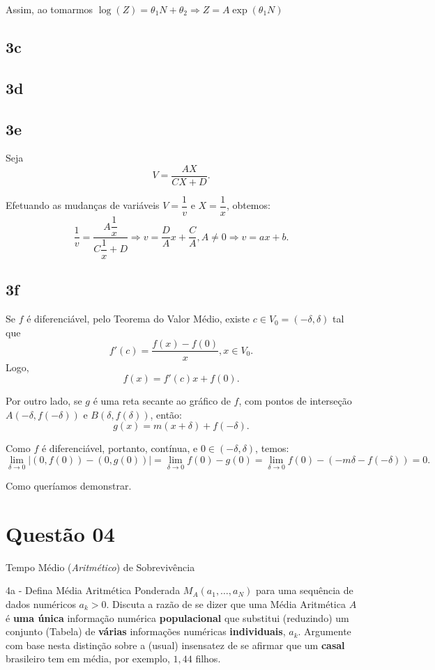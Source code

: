 {Assim, ao tomarmos \(\log(Z) = \theta_1N+\theta_2 \Rightarrow Z = A \exp(\theta_1N)\)


\subsection*{3c}

\subsection*{3d}

\subsection*{3e}
Seja
\[V = \dfrac{AX}{CX+D}.\]

Efetuando as mudanças de variáveis \(V = \dfrac{1}{v}\) e \(X = \dfrac{1}{x}\), obtemos:
\[\dfrac{1}{v} = \dfrac{A\dfrac{1}{x}}{C\dfrac{1}{x}+D}
\Rightarrow
v = \dfrac{D}{A} x + \dfrac{C}{A}, A \ne 0
\Rightarrow
v = a x + b
.\]


\subsection*{3f}

Se \(f\) é diferenciável, pelo Teorema do Valor Médio, existe \(c \in V_0 = (-\delta, \delta)\) tal que
\[f'(c) = \dfrac{f(x) - f(0)}{x}, x \in V_0.\]
Logo,
\[f(x) = f'(c)x+f(0).\]

Por outro lado, se \(g\) é uma reta secante ao gráfico de \(f\), com pontos de interseção \(A(-\delta, f(-\delta))\) e \(B(\delta, f(\delta))\), então:
\[g(x) = m(x+\delta)+f(-\delta).\]

Como \(f\) é diferenciável, portanto, contínua, e \(0 \in (-\delta, \delta)\), temos:
\[\displaystyle \lim_{\delta \to 0} |(0,f(0)) - (0,g(0))|
= \lim_{\delta \to 0} f(0)-g(0)
= \lim_{\delta \to 0} f(0)-(-m\delta-f(-\delta))
= 0.
\]

Como queríamos demonstrar.
}

\section*{Questão 04}


Tempo Médio (\textit{Aritmético}) de Sobrevivência

    4a - Defina Média Aritmética Ponderada \(M_A(a_1, \ldots, a_N)\) para uma sequência de dados numéricos \(a_k > 0\). Discuta a razão de se dizer que uma Média Aritmética \(A\) é \textbf{uma única} informação numérica \textbf{populacional} que substitui (reduzindo) um conjunto (Tabela) de \textbf{várias} informações numéricas \textbf{individuais}, \(a_k\). Argumente com base nesta distinção sobre a (usual) insensatez de se afirmar que um \textbf{casal} brasileiro tem em média, por exemplo, \(1,44\) filhos.

